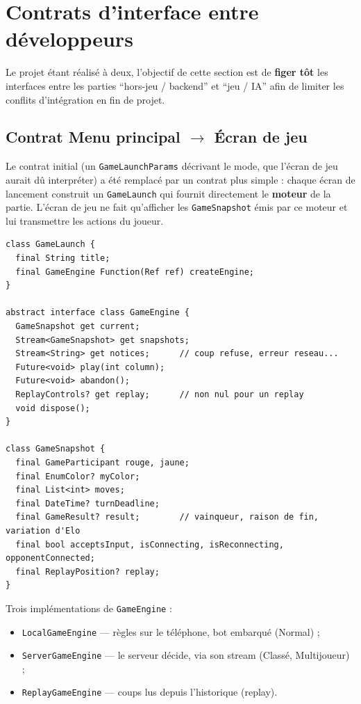 \documentclass[a4paper,11pt]{article}
\begin{document}
\section{Contrats d'interface entre développeurs}

Le projet étant réalisé à deux, l'objectif de cette section est de \textbf{figer tôt}
les interfaces entre les parties ``hors-jeu / backend'' et ``jeu / IA'' afin de
limiter les conflits d'intégration en fin de projet.

\subsection{Contrat Menu principal $\rightarrow$ Écran de jeu}

Le contrat initial (un \texttt{GameLaunchParams} décrivant le mode, que l'écran de
jeu aurait dû interpréter) a été remplacé par un contrat plus simple : chaque écran
de lancement construit un \texttt{GameLaunch} qui fournit directement le
\textbf{moteur} de la partie. L'écran de jeu ne fait qu'afficher les
\texttt{GameSnapshot} émis par ce moteur et lui transmettre les actions du joueur.

\begin{lstlisting}
class GameLaunch {
  final String title;
  final GameEngine Function(Ref ref) createEngine;
}

abstract interface class GameEngine {
  GameSnapshot get current;
  Stream<GameSnapshot> get snapshots;
  Stream<String> get notices;      // coup refuse, erreur reseau...
  Future<void> play(int column);
  Future<void> abandon();
  ReplayControls? get replay;      // non nul pour un replay
  void dispose();
}

class GameSnapshot {
  final GameParticipant rouge, jaune;
  final EnumColor? myColor;
  final List<int> moves;
  final DateTime? turnDeadline;
  final GameResult? result;        // vainqueur, raison de fin, variation d'Elo
  final bool acceptsInput, isConnecting, isReconnecting, opponentConnected;
  final ReplayPosition? replay;
}
\end{lstlisting}

Trois implémentations de \texttt{GameEngine} :
\begin{itemize}[leftmargin=1.5em]
  \item \texttt{LocalGameEngine} --- règles sur le téléphone, bot embarqué (Normal) ;
  \item \texttt{ServerGameEngine} --- le serveur décide, via son stream
        (Classé, Multijoueur) ;
  \item \texttt{ReplayGameEngine} --- coups lus depuis l'historique (replay).
\end{itemize}
\end{document}
